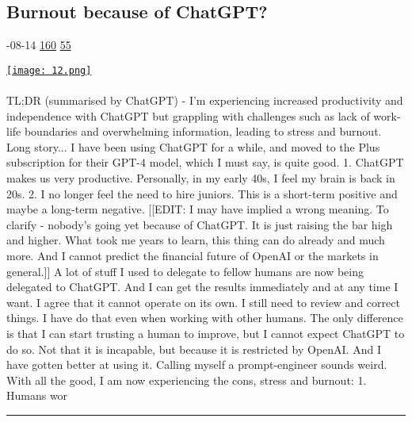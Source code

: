 \documentclass[10pt,a4paper]{article}
\begin{document}
\begin{multicols*}{2}
\begin{minipage}{\linewidth}
\subsection{Burnout because of ChatGPT?}
\textsc{\footnotesize
{\scriptsize\faCalendar}-08-14 
{\scriptsize\faThumbsOUp}\space 
\href{http://news.ycombinator.com/item?id=37138807\&utm\_term=comment}{160} 
{\scriptsize\faComments}\space 
\href{http://news.ycombinator.com/item?id=37138807\&utm\_term=comment}{55} 
}
\par\medskip\noindent
\href{https://news.ycombinator.com/item?id=37126182\&utm\_source=hackernewsletter\&utm\_medium=email\&utm\_term=ask\_hn}{
    \texttt{[image: 12.png]}
}
\end{minipage}
\paragraph{}
TL;DR (summarised by ChatGPT) - I'm experiencing increased productivity and independence with ChatGPT but grappling with challenges such as lack of work-life boundaries and overwhelming information, leading to stress and burnout.
Long story...
I have been using ChatGPT for a while, and moved to the Plus subscription for their GPT-4 model, which I must say, is quite good.
1. ChatGPT makes us very productive. Personally, in my early 40s, I feel my brain is back in 20s.
2. I no longer feel the need to hire juniors. This is a short-term positive and maybe a long-term negative.
[[EDIT: I may have implied a wrong meaning. To clarify - nobody's going yet because of ChatGPT. It is just raising the bar high and higher. What took me years to learn, this thing can do already and much more. And I cannot predict the financial future of OpenAI or the markets in general.]]
A lot of stuff I used to delegate to fellow humans are now being delegated to ChatGPT. And I can get the results immediately and at any time I want. I agree that it cannot operate on its own. I still need to review and correct things. I have do that even when working with other humans. The only difference is that I can start trusting a human to improve, but I cannot expect ChatGPT to do so. Not that it is incapable, but because it is restricted by OpenAI.
And I have gotten better at using it. Calling myself a prompt-engineer sounds weird.
With all the good, I am now experiencing the cons, stress and burnout:
1. Humans wor
\par\noindent\textcolor{red}{\rule{\linewidth}{0.2mm}}
\vfill
\null
\noindent\begin{minipage}{\linewidth}

\end{minipage}
\end{multicols*}
\end{document}
